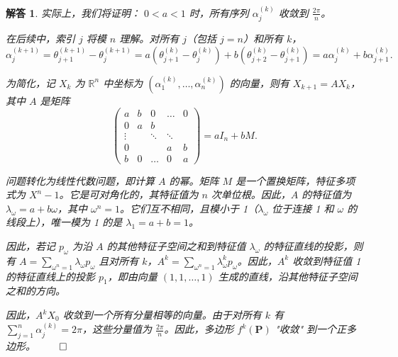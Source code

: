 \documentclass[12pt,UTF8]{ctexbook}
\theoremstyle{exercisestyle}
\theoremstyle{solutionstyle}
\newtheorem*{solution*}{解答}
\newenvironment{solution}
  {\begin{solution*}}
  {\hfill\ensuremath{\qed}\end{solution*}}
\begin{document}
\begin{solution}
实际上，我们将证明： \(0 < a < 1\) 时，所有序列 \(\alpha_j^{(k)}\) 收敛到 \(\displaystyle\frac{2\pi}{n}\)。

在后续中，索引 \(j\) 将模 \(n\) 理解。对所有 \(j\)（包括 \(j = n\)）和所有 \(k\)，
\[
\alpha_j^{(k+1)} = \theta_{j+1}^{(k+1)} - \theta_j^{(k+1)} = a(\theta_{j+1}^{(k)} - \theta_j^{(k)}) + b(\theta_{j+2}^{(k)} - \theta_{j+1}^{(k)}) = a\alpha_j^{(k)} + b\alpha_{j+1}^{(k)}.
\]

为简化，记 \(X_k\) 为 \(\mathbb{R}^n\) 中坐标为 \((\alpha_1^{(k)},\ldots,\alpha_n^{(k)})\) 的向量，则有 \(X_{k+1} = A X_k\)，其中 \(A\) 是矩阵
\[
\begin{pmatrix}
a & b & 0 & \dots & 0 \\
0 & a & b & & \\
\vdots & & \ddots & \ddots & \\
0 & & & a & b \\
b & 0 & \dots & 0 & a
\end{pmatrix} = a I_n + b M.
\]

问题转化为线性代数问题，即计算 \(A\) 的幂。矩阵 \(M\) 是一个置换矩阵，特征多项式为 \(X^n - 1\)。它是可对角化的，其特征值为 \(n\) 次单位根。因此，\(A\) 的特征值为 \(\lambda_{\omega} = a + b \omega\)，其中 \(\omega^{n} = 1\)。它们互不相同，且模小于 1（\(\lambda_{\omega}\) 位于连接 1 和 \(\omega\) 的线段上），唯一模为 1 的是 \(\lambda_1 = a + b = 1\)。

因此，若记 \(p_{\omega}\) 为沿 \(A\) 的其他特征子空间之和到特征值 \(\lambda_{\omega}\) 的特征直线的投影，则有 \(A = \sum_{\omega^n=1} \lambda_{\omega} p_{\omega}\) 且对所有 \(k\)，\(A^k = \sum_{\omega^n=1} \lambda_{\omega}^k p_{\omega}\)。因此，\(A^k\) 收敛到特征值 1 的特征直线上的投影 \(p_1\)，即由向量 \((1, 1, \ldots, 1)\) 生成的直线，沿其他特征子空间之和的方向。

因此，\(A^k X_0\) 收敛到一个所有分量相等的向量。由于对所有 \(k\) 有 \(\sum_{j=1}^{n} \alpha_j^{(k)} = 2\pi\)，这些分量值为 \(\frac{2\pi}{n}\)。因此，多边形 \(f^k(\mathbf{P})\) "收敛" 到一个正多边形。
\end{solution}
\end{document}
